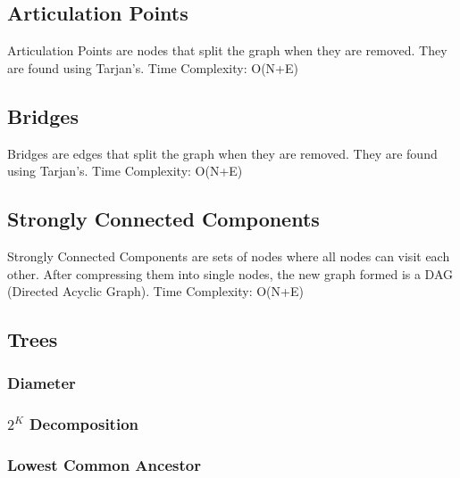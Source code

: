 \documentclass{article}
\begin{document}
\subsection{Articulation Points}
\begin{flushleft}
Articulation Points are nodes that split the graph when they are removed.
They are found using Tarjan's.
\newline
Time Complexity: O(N+E)
\end{flushleft}


\subsection{Bridges}
\begin{flushleft}
Bridges are edges that split the graph when they are removed.
They are found using Tarjan's.
\newline
Time Complexity: O(N+E)
\end{flushleft}


\subsection{Strongly Connected Components}
\begin{flushleft}
Strongly Connected Components are sets of nodes where all nodes can
visit each other. After compressing them into single nodes, the new graph
formed is a DAG (Directed Acyclic Graph).
\newline
Time Complexity: O(N+E)
\end{flushleft}


\subsection{Trees}
\subsubsection{Diameter}

\subsubsection{\texorpdfstring{$2^{K}$}{} Decomposition}

\subsubsection{Lowest Common Ancestor}

\end{document}
